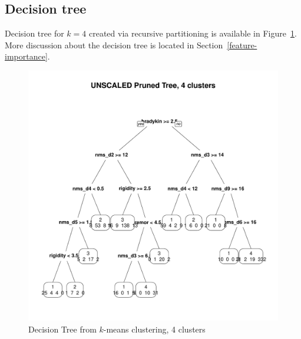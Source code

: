 \documentclass[letterpaper,12pt]{article}
\begin{document}
\subsection{Decision tree}

Decision tree for $k = 4$ created via recursive partitioning is available in
Figure~\ref{fig:kmeans-dtree-4}. More discussion about the decision tree is
located in Section~\ref{feature-importance}.

\begin{figure}[h]
  \centering
  \includegraphics[width=\linewidth]{dtree-kmeans-pruned-unscaled-4.pdf}
  \caption{Decision Tree from $k$-means clustering, 4 clusters}
  \label{fig:kmeans-dtree-4}
\end{figure}
\end{document}
